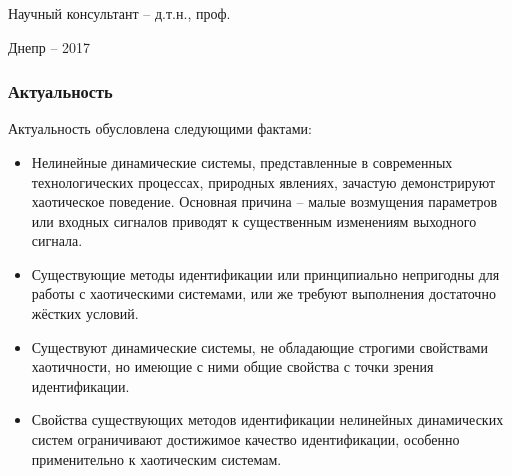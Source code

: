\documentclass[10pt,utf8]{beamer}
\author{\dissauthorRu}
\title[Семинар -- 2017]{\booknameRu}
\begin{document}
\begin{frame}
  \frametitle{}
  \begin{center}
    {\Large \color{blue} \booknameRu}

    \vfill

    {\large \dissauthorMain}

    \vfill

    Научный консультант -- д.т.н., проф. \superRu

    \vfill

    Днепр -- 2017
  \end{center}
\end{frame}


\begin{frame}
  \frametitle{Актуальность}

  Актуальность обусловлена следующими фактами:

  \begin{itemize}

    \item
      Нелинейные динамические системы, представленные в современных
      технологических процессах, природных явлениях, зачастую
      демонстрируют хаотическое поведение.
      Основная причина -- малые возмущения параметров или входных сигналов
      приводят к существенным изменениям выходного сигнала.

    \item
      Существующие методы идентификации или принципиально непригодны для
      работы с хаотическими системами, или же требуют выполнения
      достаточно жёстких условий.

    \item
      Существуют динамические системы, не обладающие строгими свойствами хаотичности,
      но имеющие с ними общие свойства с точки зрения идентификации.

    \item
      Свойства существующих методов идентификации нелинейных динамических систем
      ограничивают достижимое качество идентификации,
      особенно применительно к хаотическим системам.

  \end{itemize}


\end{frame}


\end{document}
